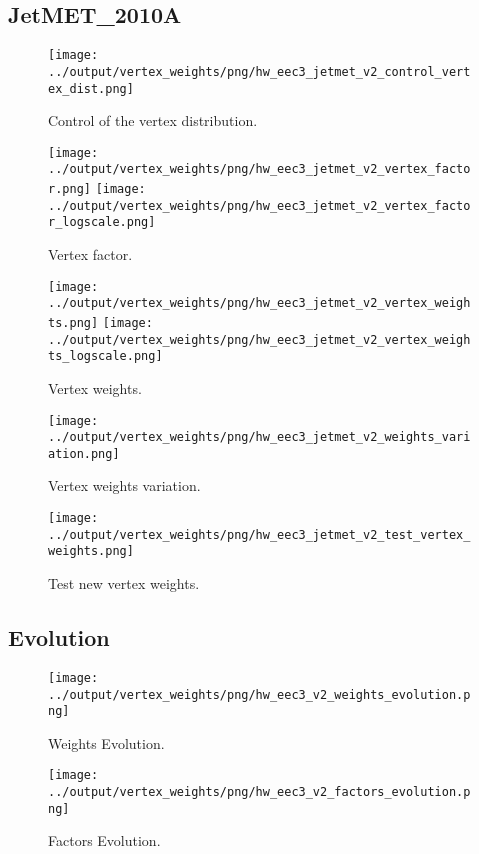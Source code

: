 \documentclass[11pt]{book}
\begin{document}
\subsection{JetMET\_2010A}
\begin{figure}[ht]
\centering
\texttt{[image: ../output/vertex\_weights/png/hw\_eec3\_jetmet\_v2\_control\_vertex\_dist.png]}
\caption{Control of the vertex distribution.}
\end{figure}

\begin{figure}[ht]
\centering
\texttt{[image: ../output/vertex\_weights/png/hw\_eec3\_jetmet\_v2\_vertex\_factor.png]}
\texttt{[image: ../output/vertex\_weights/png/hw\_eec3\_jetmet\_v2\_vertex\_factor\_logscale.png]}
\caption{Vertex factor.}
\end{figure}

\begin{figure}[ht]
\centering
\texttt{[image: ../output/vertex\_weights/png/hw\_eec3\_jetmet\_v2\_vertex\_weights.png]}
\texttt{[image: ../output/vertex\_weights/png/hw\_eec3\_jetmet\_v2\_vertex\_weights\_logscale.png]}
\caption{Vertex weights.}
\end{figure}

\begin{figure}[ht]
\centering
\texttt{[image: ../output/vertex\_weights/png/hw\_eec3\_jetmet\_v2\_weights\_variation.png]}
\caption{Vertex weights variation.}
\end{figure}

\begin{figure}[ht]
\centering
\texttt{[image: ../output/vertex\_weights/png/hw\_eec3\_jetmet\_v2\_test\_vertex\_weights.png]}
\caption{Test new vertex weights.}
\end{figure}
\clearpage

\subsection{Evolution}
\begin{figure}[ht]
\centering
\texttt{[image: ../output/vertex\_weights/png/hw\_eec3\_v2\_weights\_evolution.png]}
\caption{Weights Evolution.}
\end{figure}


\begin{figure}[ht]
\centering
\texttt{[image: ../output/vertex\_weights/png/hw\_eec3\_v2\_factors\_evolution.png]}
\caption{Factors Evolution.}
\end{figure}
\end{document}
